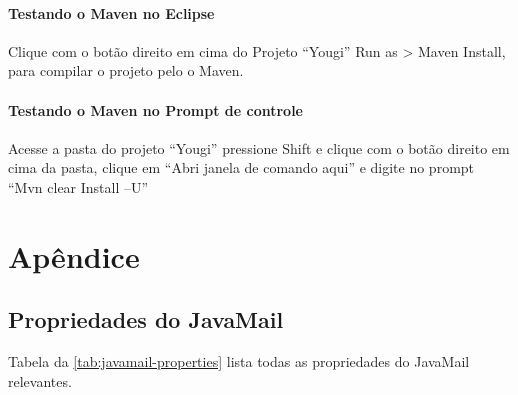 \documentclass[envcountsame,envcountchap,letterpaper]{svmono}
\begin{document}
\subsection {Testando o Maven no Eclipse}

Clique com o botão direito em cima do Projeto “Yougi” Run as > Maven Install, para compilar o projeto pelo o Maven. 

\subsection {Testando o Maven no Prompt de controle}

Acesse a pasta do projeto “Yougi” pressione Shift e clique com o botão direito em cima da pasta, clique em “Abri janela de comando aqui” e digite no prompt “Mvn clear Install –U”

\part*{Apêndice}

\chapter*{Propriedades do JavaMail}

Tabela da \ref{tab:javamail-properties} lista todas as propriedades do JavaMail relevantes.
\end{document}
